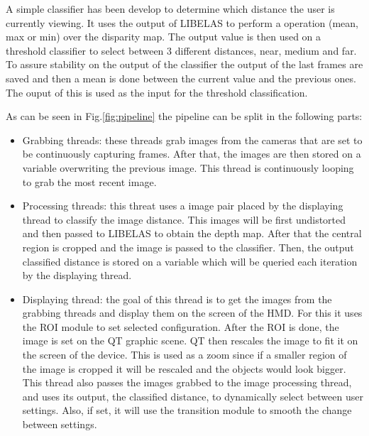 \documentclass[10pt,a4paper,twocolumn,twoside]{article}
\begin{document}
	A simple classifier has been develop to determine which distance the user is currently viewing. It uses the output of LIBELAS to perform a operation (mean, max or min) over the disparity map. The output value is then used on a threshold classifier to select between 3 different distances, near, medium and far. 
	To assure stability on the output of the classifier the output of the last frames are saved and then a mean is done between the current value and the previous ones. The ouput of this  is used as the input for the threshold classification. 
	
	As can be seen in Fig.\ref{fig:pipeline} the pipeline can be split in the following parts: 
	
	\begin{itemize}
		\item Grabbing threads: these threads grab images from the cameras that are set to be continuously capturing frames. After that, the images are then stored on a variable overwriting the previous image. This thread is continuously looping to grab the most recent image.
		
		\item Processing threads: this threat uses a image pair placed by the displaying thread to classify the image distance. This images will be first undistorted and then passed to LIBELAS to obtain the depth map. After that the central region is cropped and the image is passed to the classifier. Then, the output classified distance is stored on a variable which will be queried each iteration by the displaying thread.  
		
		\item Displaying thread: the goal of this thread is to get the images from the grabbing threads and display them on the screen of the HMD. For this it uses the ROI module to set selected configuration. After the ROI is done, the image is set on the QT graphic scene. QT then rescales the image to fit it on the screen of the device. This is used as a zoom since if a smaller region of the image is cropped it will be rescaled and the objects would look bigger. This thread also passes the images grabbed to the image processing thread, and uses its output, the classified distance, to dynamically select between user settings. Also, if set, it will use the transition module to smooth the change between settings. 
		
	\end{itemize}
	
\end{document}
